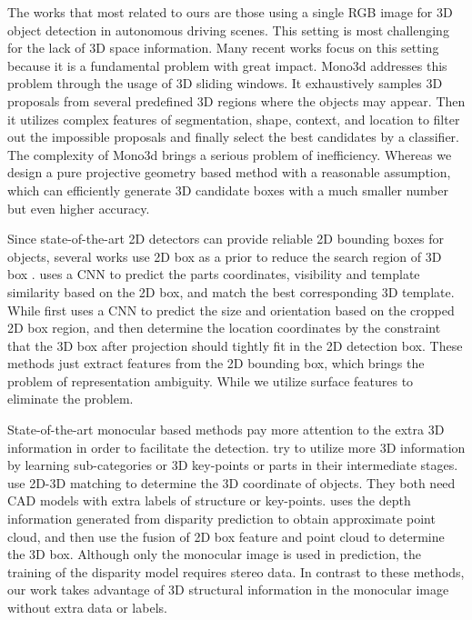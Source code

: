 \documentclass[10pt,twocolumn,letterpaper]{article}
\begin{document}
The works that most related to ours are those using a single RGB image for 3D object detection in autonomous driving scenes. This setting is most challenging for the lack of 3D space information. Many recent works focus on this setting because it is a fundamental problem with great impact. Mono3d\cite{mono3d} addresses this problem through the usage of 3D sliding windows. It exhaustively samples 3D proposals from several predefined 3D regions where the objects may appear. Then it utilizes complex features of segmentation, shape, context, and location to filter out the impossible proposals and finally select the best candidates by a classifier. The complexity of Mono3d brings a serious problem of inefficiency. Whereas we design a pure projective geometry based method with a reasonable assumption, which can efficiently generate 3D candidate boxes with a much smaller number but even higher accuracy.

Since state-of-the-art 2D detectors \cite{fasterrcnn,lu2018grid,li2019gradient,liu2017recurrent,li2019zoom} can provide reliable 2D bounding boxes for objects, several works use 2D box as a prior to reduce the search region of 3D box \cite{deepmanta,deep3dbox}. \cite{deepmanta} uses a CNN to predict the parts coordinates, visibility and template similarity based on the 2D box, and match the best corresponding 3D template. While \cite{deep3dbox} first uses a CNN to predict the size and orientation based on the cropped 2D box region, and then determine the location coordinates by the constraint that the 3D box after projection should tightly fit in the 2D detection box. These methods just extract features from the 2D bounding box, which brings the problem of representation ambiguity. While we utilize surface features to eliminate the problem.

State-of-the-art monocular based methods pay more attention to the extra 3D information in order to facilitate the detection. \cite{subcnn,deepmanta,cad} try to utilize more 3D information by learning sub-categories or 3D key-points or parts in their intermediate stages. \cite{deepmanta,cad} use 2D-3D matching to determine the 3D coordinate of objects. They both need CAD models with extra labels of structure or key-points. \cite{mfusion} uses the depth information generated from disparity prediction to obtain approximate point cloud, and then use the fusion of 2D box feature and point cloud to determine the 3D box. Although only the monocular image is used in prediction, the training of the disparity model requires stereo data. In contrast to these methods, our work takes advantage of 3D structural information in the monocular image without extra data or labels.
\end{document}
